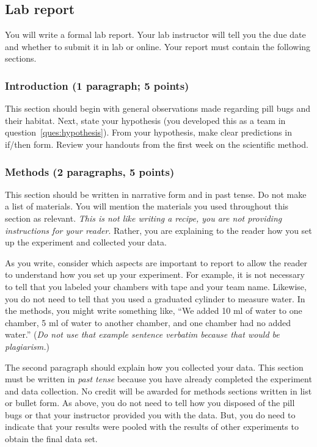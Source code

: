 \documentclass[12pt, hidelinks]{exam}
\begin{document}
\subsection*{Lab report}

You will write a formal lab report. Your lab instructor will tell you the due date and whether to submit it in lab or online. Your report must contain the following sections. 
 
\subsubsection*{Introduction (1 paragraph; 5 points)} 

This section should begin with general observations made regarding
pill bugs and their habitat. Next, state your hypothesis (you developed this as a team in question~\ref{ques:hypothesis}).
From your hypothesis, make clear predictions in if/then form. Review your handouts from
the first week on the scientific method.

\subsubsection*{Methods (2 paragraphs, 5 points)} 

This section should be written in narrative form and in past tense. Do
not make a list of materials. You will mention the materials you used
throughout this section as relevant. \emph{This is not like writing a
	recipe, you are not providing instructions for your reader}. Rather, you
are explaining to the reader how you set up the experiment and collected
your data.

As you write, consider which aspects are important to report to allow
the reader to understand how you set up your experiment. For example, it
is not necessary to tell that you labeled your chambers with tape and your team name. Likewise, you do not need to tell that you used a graduated cylinder to measure water. In the methods, you might
write something like, ``We added 10 ml of water to one chamber, 5 ml of water to another chamber, and one chamber had no added water.'' (\emph{Do not use that example sentence verbatim because that would be plagiarism.})

The second paragraph should explain how you
collected your data. This section must be written in \emph{past tense} because you have
already completed the experiment and data collection. No credit will be
awarded for methods sections written in list or bullet form. As above, you do not need to tell how you disposed of the pill bugs or that your instructor provided you with the data. But, you do need to indicate that your results were pooled with the results of other experiments to obtain the final data set.
\end{document}
